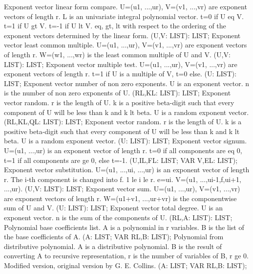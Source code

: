 \bcom Exponent vector linear form compare. U=(u1, ...,ur),
V=(v1, ...,vr) are exponent vectors of length r.
L is an univariate integral polynomial vector.
t=0 if U eq V. t=1 if U gt V. t=-1 if U lt V. eq, gt, lt
with respect to the ordering of the exponent vectors 
determined by the linear form. \ecom 
{} (U,V: LIST): LIST; \eproc
\bcom Exponent vector least common multiple. U=(u1, ...,ur),
V=(v1, ...,vr) are exponent vectors of length r.
W=(w1, ...,wr) is the least common multiple of U and V.  \ecom 
{} (U,V: LIST): LIST; \eproc
\bcom Exponent vector multiple test. U=(u1, ...,ur),
V=(v1, ...,vr) are exponent vectors of length r.
t=1 if U is a multiple of V, t=0 else.  \ecom 
{} (U: LIST): LIST; \eproc
\bcom Exponent vector number of non zero exponents. U is an
exponent vector. n is the number of non zero exponents of U.  \ecom 
{} (RL,KL: LIST): LIST; \eproc
\bcom Exponent vector random. r is the length of U. k is a
positive beta-digit such that every component of U will be
less than k and k lt beta. U is a random exponent vector. \ecom 
{} (RL,KL,QL: LIST): LIST; \eproc
\bcom Exponent vector random. r is the length of U. k is a
positive beta-digit such that every component of U will be
less than k and k lt beta. U is a random exponent vector. \ecom 
{} (U: LIST): LIST; \eproc
\bcom Exponent vector signum. U=(u1, ...,ur) is an exponent vector
of length r. t=0 if all components are eq 0, t=1 if all
components are ge 0, else t=-1. \ecom 
{} (U,IL,FL: LIST; VAR V,EL: LIST); \eproc
\bcom Exponent vector substitution. U=(u1, ...,ui, ...,ur)
is an exponent vector of length r. The i-th component is
changed into f. 1 le i le r. e=ui. 
V=(u1, ...,ui-1,f,ui+1, ...,ur).  \ecom 
{} (U,V: LIST): LIST; \eproc
\bcom Exponent vector sum. U=(u1, ...,ur), V=(v1, ...,vr) are
exponent vectors of length r. W=(u1+v1, ...,ur+vr) is the
componentwise sum of U and V.  \ecom 
{} (U: LIST): LIST; \eproc
\bcom Exponent vector total degree. U is an exponent vector.
n is the sum of the components of U. \ecom 
{} (RL,A: LIST): LIST; \eproc
\bcom Polynomial base coefficients list. A is a polynomial in
r variables. B is the list of the base coefficients of A.  \ecom 
{} (A: LIST; VAR RL,B: LIST); \eproc
\bcom Polynomial from distributive polynomial. A is a distributive
polynomial. B is the result of converting A to recursive
representation, r is the number of variables of B, r ge 0.
Modified version, original version by G. E. Collins.  \ecom 
{} (A: LIST; VAR RL,B: LIST); \eproc
